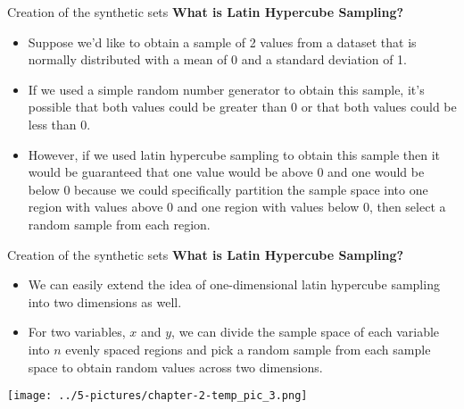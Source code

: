 \documentclass[11pt]{beamer}
\begin{document}
\begin{frame}{Creation of the synthetic sets}
\textbf{What is Latin Hypercube Sampling?}
\begin{itemize}
\item Suppose we’d like to obtain a sample of 2 values from a dataset that is normally distributed with a mean of 0 and a standard deviation of 1.

\item If we used a simple random number generator to obtain this sample, it’s possible that both values could be greater than 0 or that both values could be less than 0.

\item However, if we used latin hypercube sampling to obtain this sample then it would be guaranteed that one value would be above 0 and one would be below 0 because we could specifically partition the sample space into one region with values above 0 and one region with values below 0, then select a random sample from each region.
\end{itemize}
\end{frame}
\begin{frame}{Creation of the synthetic sets}
\textbf{What is Latin Hypercube Sampling?}
\begin{itemize}
\item We can easily extend the idea of one-dimensional latin hypercube sampling into two dimensions as well.

\item For two variables, $x$ and $y$, we can divide the sample space of each variable into  $n$ evenly spaced regions and pick a random sample from each sample space to obtain random values across two dimensions.
\end{itemize}
	\begin{center}
	\texttt{[image: ../5-pictures/chapter-2-temp\_pic\_3.png]}
	\end{center}
\end{frame}
\end{document}
